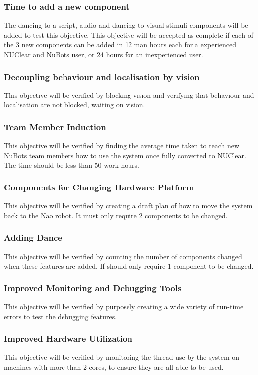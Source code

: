 \documentclass[english,12pt]{scrartcl}
\begin{document}
			\subsubsection{Time to add a new component}
				The dancing to a script, audio and dancing to visual stimuli components will be added to test this objective. This objective will be accepted as complete if each of the 3 new components can be added in 12 man hours each for a experienced NUClear and NuBots user, or 24 hours for an inexperienced user.
			\subsubsection{Decoupling behaviour and localisation by vision}
				This objective will be verified by blocking vision and verifying that behaviour and localisation are not blocked, waiting on vision.
			\subsubsection{Team Member Induction}
				This objective will be verified by finding the average time taken to teach new NuBots team members how to use the system once fully converted to NUClear. The time should be less than 50 work hours.
			\subsubsection{Components for Changing Hardware Platform}
				This objective will be verified by creating a draft plan of how to move the system back to the Nao robot. It must only require 2 components to be changed.
			\subsubsection{Adding Dance}
				This objective will be verified by counting the number of components changed when these features are added. If should only require 1 component to be changed.
			\subsubsection{Improved Monitoring and Debugging Tools}
				This objective will be verified by purposely creating a wide variety of run-time errors to test the debugging features.
			\subsubsection{Improved Hardware Utilization}
				This objective will be verified by monitoring the thread use by the system on machines with more than 2 cores, to ensure they are all able to be used.
\end{document}
